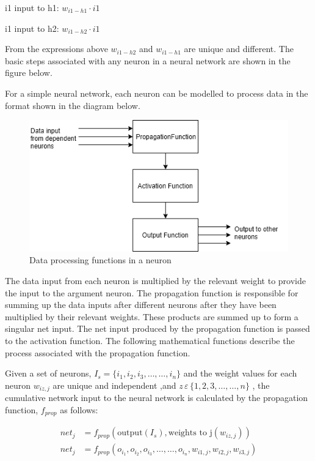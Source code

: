 \hspace{20mm}i1 input to h1: $w_{i1-h1}\cdot i1$

\hspace{20mm}i1 input to h2: $w_{i1-h2}\cdot i1$

From the expressions above $w_{i1-h2}$ and $w_{i1-h1}$ are unique and different. The basic steps associated with any neuron in a neural network are shown in the figure below.

For a simple neural network, each neuron can be modelled to process data in the format shown in the diagram below.

\begin{figure}[h]
	\centering
	\includegraphics[scale=0.7]{7}
	\caption{Data processing functions in a neuron}
\end{figure}

The data input from each neuron is multiplied by the relevant weight to provide the input to the argument neuron. The propagation function is responsible for summing up the data inputs after different neurons after they have been multiplied by their relevant weights. These products are summed up to form a singular net input. The net input produced by the propagation function is passed to the activation function. The following mathematical functions describe the process associated with the propagation function.
	
Given a set of neurons, $I_s= \{i_1,i_2,i_3,…,…,i_n\}$ and the weight values for each neuron $w_{iz,j}$ are unique and independent ,and $z\, \varepsilon \, \{1,2,3,…,…,n\}$ , the cumulative network input to the neural network is calculated by the propagation function, $f_{prop}$ as follows:

\begin{align}
	net_j &= f_{prop} (\text{output}(I_s ),\text{weights to j}(w_{iz,j})) \nonumber \\  
net_j &=f_{prop} (o_{i_1},o_{i_2},o_{i_3} ,…,…,o_{i_n},w_{i1,j},w_{i2,j},w_{i3,j} )	
\end{align}

